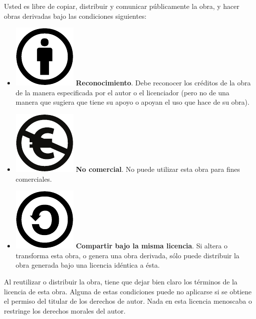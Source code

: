 Usted es libre de copiar, distribuir y comunicar públicamente la obra,
y hacer obras derivadas bajo las condiciones siguientes:
\begin{itemize}
\item \includegraphics[scale=0.35]{../figs/by} \textbf{Reconocimiento}.
Debe reconocer los créditos de la obra de la manera especificada por
el autor o el licenciador (pero no de una manera que sugiera que tiene
su apoyo o apoyan el uso que hace de su obra). 
\item \includegraphics[scale=0.35]{../figs/nc-eu} \textbf{No comercial}.
No puede utilizar esta obra para fines comerciales. 
\item \includegraphics[scale=0.35]{../figs/sa} \textbf{Compartir bajo la
misma licencia}. Si altera o transforma esta obra, o genera una obra
derivada, sólo puede distribuir la obra generada bajo una licencia
idéntica a ésta. 
\end{itemize}
Al reutilizar o distribuir la obra, tiene que dejar bien claro los
términos de la licencia de esta obra. Alguna de estas condiciones
puede no aplicarse si se obtiene el permiso del titular de los derechos
de autor. Nada en esta licencia menoscaba o restringe los derechos
morales del autor.

